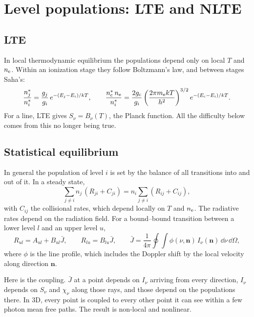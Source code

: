 \section{Level populations: LTE and NLTE}

\subsection{LTE}
In local thermodynamic equilibrium the populations depend only on local $T$ and $n_{\rm e}$. Within an ionization stage they follow Boltzmann's law, and between stages Saha's:
\begin{equation}
\frac{n_j^*}{n_i^*}=\frac{g_j}{g_i}\,e^{-(E_j-E_i)/kT},\qquad
\frac{n^*_{\rm c}\,n_{\rm e}}{n^*_{i}}=\frac{2g_{\rm c}}{g_i}\left(\frac{2\pi m_{\rm e}kT}{h^2}\right)^{3/2}e^{-(E_{\rm c}-E_i)/kT}.
\end{equation}
For a line, LTE gives $S_\nu=B_\nu(T)$, the Planck function. All the difficulty below comes from this no longer being true.

\subsection{Statistical equilibrium}
In general the population of level $i$ is set by the balance of all transitions into and out of it. In a steady state,
\begin{equation}
\sum_{j\neq i}n_j\,(R_{ji}+C_{ji})=n_i\sum_{j\neq i}(R_{ij}+C_{ij}),\label{eq:se}
\end{equation}
with $C_{ij}$ the collisional rates, which depend locally on $T$ and $n_{\rm e}$. The radiative rates depend on the radiation field. For a bound--bound transition between a lower level $l$ and an upper level $u$,
\begin{equation}
R_{ul}=A_{ul}+B_{ul}\bar J,\qquad R_{lu}=B_{lu}\bar J,\qquad
\bar J=\frac{1}{4\pi}\oint\!\!\int\phi(\nu,\mathbf n)\,I_\nu(\mathbf n)\,\dd\nu\,\dd\Omega ,
\end{equation}
where $\phi$ is the line profile, which includes the Doppler shift by the local velocity along direction $\mathbf n$.

Here is the coupling. $\bar J$ at a point depends on $I_\nu$ arriving from every direction, $I_\nu$ depends on $S_\nu$ and $\chi_\nu$ along those rays, and those depend on the populations there. In 3D, every point is coupled to every other point it can see within a few photon mean free paths. The result is non-local and nonlinear.

